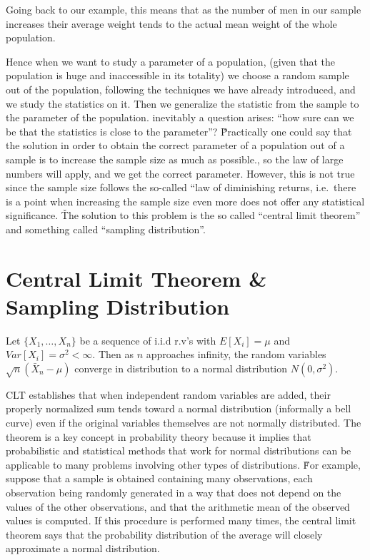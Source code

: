 \be
Going back to our example, this means that as the number of men in our sample increases their average weight tends to
the actual mean weight of the whole population.
\ee

Hence when we want to study a parameter of a population, (given that the population is huge and inaccessible in its
totality) we choose a random sample out of the population, following the techniques we have already introduced, and
we study the statistics on it. Then we generalize the statistic from the sample to the parameter of the population.
inevitably a question arises: ``how sure can we be that the statistics is close to the parameter''? \v

Practically one could say that the solution in order to obtain the correct parameter of a population out of a sample
is to increase the sample size as much as possible., so the law of large numbers will apply, and we get the correct
parameter. However, this is not true since the sample size follows the so-called ``law of diminishing returns, i.e.\
there is a point when increasing the sample size even more does not offer any statistical significance. \v

The solution to this problem is the so called ``central limit theorem'' and something called ``sampling distribution''.

\section{Central Limit Theorem \& Sampling Distribution}

Let $\{X_{1},\ldots,X_{n}\}$ be a sequence of i.i.d r.v's with $E[X_{i}]=\mu$ and $Var[X_{i}] = \sigma^{2} < \infty$.
Then as $n$ approaches infinity, the random variables $ \sqrt{n} ({\bar {X}}_{n} - \mu)$ converge in distribution
to a normal distribution $N(0,\sigma ^{2})$.
\et

CLT establishes that when independent random variables are added, their properly normalized sum tends toward a normal
distribution (informally a bell curve) even if the original variables themselves are not normally distributed. The
theorem is a key concept in probability theory because it implies that probabilistic and statistical methods that
work for normal distributions can be applicable to many problems involving other types of distributions. \v

For example, suppose that a sample is obtained containing many observations, each observation being randomly
generated in a way that does not depend on the values of the other observations, and that the arithmetic mean of the
observed values is computed. If this procedure is performed many times, the central limit theorem says that the
probability distribution of the average will closely approximate a normal distribution.

